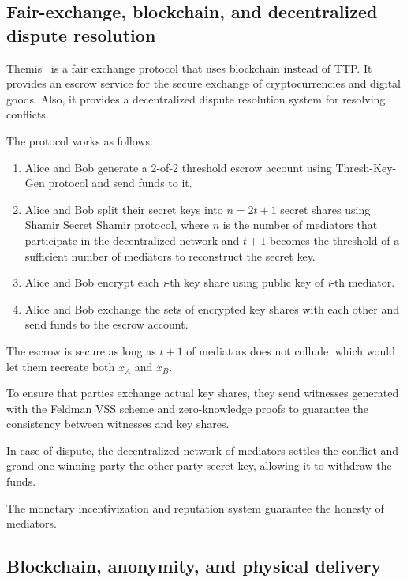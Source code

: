 \subsection{Fair-exchange, blockchain, and decentralized dispute resolution}
\label{themis-towards-decentralized-escrow-of-cryptocurrencies-without-trusted-third-parties}

Themis~\cite{mengThemisDecentralizedEscrow2019} is a fair exchange protocol that uses blockchain instead of TTP. It provides an escrow service for the secure exchange of cryptocurrencies and digital goods. Also, it provides a decentralized dispute resolution system for resolving conflicts.

The protocol works as follows:
\begin{enumerate}
    \item Alice and Bob generate a 2-of-2 threshold escrow account using Thresh-Key-Gen protocol and send funds to it.
    \item Alice and Bob split their secret keys into \(n=2t+1\) secret shares using Shamir Secret Shamir protocol, where \(n\) is the number of mediators that participate in the decentralized network and \(t+1\) becomes the threshold of a sufficient number of mediators to reconstruct the secret key.
    \item Alice and Bob encrypt each \textit{i}-th key share using public key of \textit{i}-th mediator.
    \item Alice and Bob exchange the sets of encrypted key shares with each other and send funds to the escrow account.
\end{enumerate}

The escrow is secure as long as \(t+1\) of mediators does not collude, which would let them recreate both \(x_A\) and \(x_B\). 

To ensure that parties exchange actual key shares, they send witnesses generated with the Feldman VSS scheme and zero-knowledge proofs to guarantee the consistency between witnesses and key shares.

In case of dispute, the decentralized network of mediators settles the conflict and grand one winning party the other party secret key, allowing it to withdraw the funds.

The monetary incentivization and reputation system guarantee the honesty of mediators.

\subsection{Blockchain, anonymity, and physical delivery}\label{lelantos-a-blockchain-based-anonymous-physical-delivery-system}

